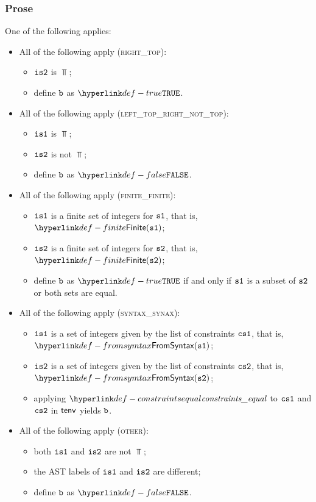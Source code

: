 \subsubsection{Prose}
One of the following applies:
\begin{itemize}
  \item All of the following apply (\textsc{right\_top}):
  \begin{itemize}
    \item $\texttt{is2}$ is $\Top$;
    \item define $\texttt{b}$ as $\True$.
  \end{itemize}

  \item All of the following apply (\textsc{left\_top\_right\_not\_top}):
  \begin{itemize}
    \item $\texttt{is1}$ is $\Top$;
    \item $\texttt{is2}$ is not $\Top$;
    \item define $\texttt{b}$ as $\False$.
  \end{itemize}

  \item All of the following apply (\textsc{finite\_finite}):
  \begin{itemize}
    \item $\texttt{is1}$ is a finite set of integers for $\texttt{s1}$, that is, $\Finite(\vsone)$;
    \item $\texttt{is2}$ is a finite set of integers for $\texttt{s2}$, that is, $\Finite(\vstwo)$;
    \item define $\texttt{b}$ as $\True$ if and only if $\texttt{s1}$ is a subset of $\texttt{s2}$ or both sets are equal.
  \end{itemize}

  \item All of the following apply (\textsc{syntax\_synax}):
  \begin{itemize}
    \item $\texttt{is1}$ is a set of integers given by the list of constraints $\texttt{cs1}$, that is, \\ $\FromSyntax(\vsone)$;
    \item $\texttt{is2}$ is a set of integers given by the list of constraints $\texttt{cs2}$, that is, \\ $\FromSyntax(\vstwo)$;
    \item applying $\constraintsequal$ to $\texttt{cs1}$ and $\texttt{cs2}$ in $\textsf{tenv}$ yields $\texttt{b}$.
  \end{itemize}

  \item All of the following apply (\textsc{other}):
  \begin{itemize}
    \item both $\texttt{is1}$ and $\texttt{is2}$ are not $\Top$;
    \item the AST labels of $\texttt{is1}$ and $\texttt{is2}$ are different;
    \item define $\texttt{b}$ as $\False$.
  \end{itemize}
\end{itemize}

